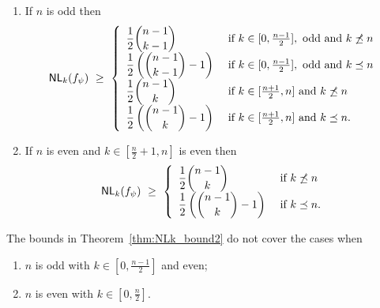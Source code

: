 \documentclass{llncs}
\begin{document}
\begin{theorem}\label{thm:NLk_bound2}
\begin{enumerate}
\item If $n$ is odd then
$$\mathsf{NL}_{k}(f_\psi) ~\geq ~ 
\left\{ \begin{array}{ll}
\displaystyle{\frac{1}{2}{n-1 \choose k-1}}  & \text{ if }  k \in [0,\frac{n-1}{2}], \text{ odd and } k \not\preceq n \\
\displaystyle{\frac{1}{2}\left({n-1 \choose k-1} - 1\right)} & \text{ if } k \in [0,\frac{n-1}{2}], \text{ odd and } k \preceq n \\
\displaystyle{\frac{1}{2}{n-1 \choose k}}  & \text{ if }  k \in [\frac{n+1}{2},n] \text{ and } k \not\preceq n \\
\displaystyle{\frac{1}{2}\left({n-1 \choose k} - 1\right)}  & \text{ if }  k \in [\frac{n+1}{2},n] \text{ and } k \preceq n.
\end{array}  \right.$$
\item If $n$ is even and $k \in [\frac{n}{2}+1, n]$ is even then 
$$\mathsf{NL}_{k}(f_\psi) ~\geq ~ 
\left\{ \begin{array}{ll}
\displaystyle{\frac{1}{2}{n-1 \choose k}}  & \text{ if }  k \not\preceq n \\
\displaystyle{\frac{1}{2}\left({n-1 \choose k} - 1\right)} & \text{ if } k \preceq n.
\end{array}  \right.$$
\end{enumerate}
\end{theorem}

\begin{note}\label{nt:nbnd}
The bounds in Theorem~\ref{thm:NLk_bound2} do not cover the cases when 
\begin{enumerate}
\item $n$ is odd with $k \in [0,\frac{n-1}{2}]$ and even;
\item $n$ is even with $k \in [0,\frac{n}{2}]$.
\end{enumerate}
\end{note}
\end{document}
